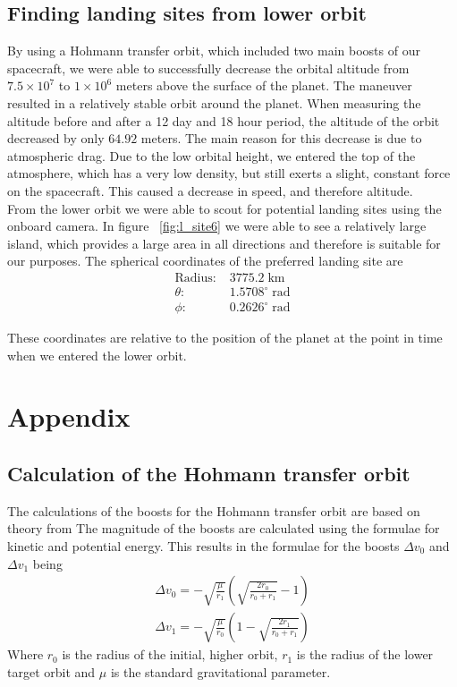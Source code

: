 \documentclass[reprint,english,notitlepage]{revtex4-2}
\begin{document}
\subsection{Finding landing sites from lower orbit}\label{subsec:finding-landing-sites-from-lower-orbit}
    By using a Hohmann transfer orbit, which included two main boosts of our spacecraft, we were able to successfully decrease the orbital altitude from $7.5 \times 10^7$ to $1 \times 10^{6}$ meters above the surface of the planet.
    The maneuver resulted in a relatively stable orbit around the planet.
    When measuring the altitude before and after a 12 day and 18 hour period, the altitude of the orbit decreased by only $64.92$ meters.
    The main reason for this decrease is due to atmospheric drag.
    Due to the low orbital height, we entered the top of the atmosphere, which has a very low density, but still exerts a slight, constant force on the spacecraft.
    This caused a decrease in speed, and therefore altitude.\\

    From the lower orbit we were able to scout for potential landing sites using the onboard camera.
    In figure ~\ref{fig:l_site6} we were able to see a relatively large island, which provides a large area in all directions and therefore is suitable for our purposes.
    The spherical coordinates of the preferred landing site are\\
    \begin{align*}
        \text{Radius}:&\; 3775.2 \;\text{km}\\
        \theta :&\; 1.5708^{\circ} \;\text{rad}\\
        \phi :&\; 0.2626^{\circ} \;\text{rad}
    \end{align*}

    These coordinates are relative to the position of the planet at the point in time when we entered the lower orbit.

\section{Appendix} \label{sec: appendix}
\subsection{Calculation of the Hohmann transfer orbit}\label{subsec:calculation-of-the-hohmann-transfer-orbit}
    The calculations of the boosts for the Hohmann transfer orbit are based on theory from %
    The magnitude of the boosts are calculated using the formulae for kinetic and potential energy.
    This results in the formulae for the boosts $\Delta v_0$ and $\Delta v_1$ being
    \begin{align*}
        \Delta v_0 = -\sqrt{\frac{\mu}{r_1}} \left(\sqrt{\frac{2r_0}{r_0 + r_1}}-1\right)\\
        \Delta v_1 = -\sqrt{\frac{\mu}{r_0}} \left(1-\sqrt{\frac{2r_1}{r_0 + r_1}}\right)
    \end{align*}
    Where $r_0$ is the radius of the initial, higher orbit, $r_1$ is the radius of the lower target orbit and $\mu$ is the standard gravitational parameter.
\end{document}
